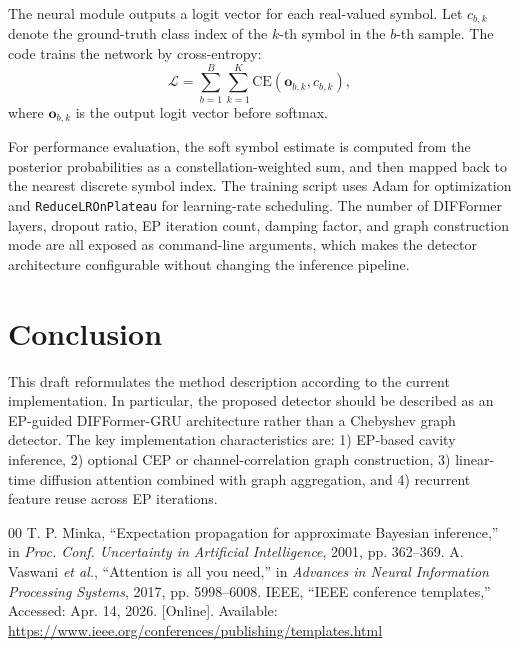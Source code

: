\documentclass[conference]{IEEEtran}
\begin{document}
The neural module outputs a logit vector for each real-valued symbol. Let $c_{b,k}$ denote the ground-truth class index of the $k$-th symbol in the $b$-th sample. The code trains the network by cross-entropy:
\begin{equation}
\mathcal{L}
=
\sum_{b=1}^{B}\sum_{k=1}^{K}
\mathrm{CE}\!\left(
\mathbf{o}_{b,k}, c_{b,k}
\right),
\label{eq:loss}
\end{equation}
where $\mathbf{o}_{b,k}$ is the output logit vector before softmax.

For performance evaluation, the soft symbol estimate is computed from the posterior probabilities as a constellation-weighted sum, and then mapped back to the nearest discrete symbol index. The training script uses Adam for optimization and \texttt{ReduceLROnPlateau} for learning-rate scheduling. The number of DIFFormer layers, dropout ratio, EP iteration count, damping factor, and graph construction mode are all exposed as command-line arguments, which makes the detector architecture configurable without changing the inference pipeline.

\section{Conclusion}

This draft reformulates the method description according to the current implementation. In particular, the proposed detector should be described as an EP-guided DIFFormer-GRU architecture rather than a Chebyshev graph detector. The key implementation characteristics are: 1) EP-based cavity inference, 2) optional CEP or channel-correlation graph construction, 3) linear-time diffusion attention combined with graph aggregation, and 4) recurrent feature reuse across EP iterations.

\begin{thebibliography}{00}
 T. P. Minka, ``Expectation propagation for approximate Bayesian inference,'' in \emph{Proc. Conf. Uncertainty in Artificial Intelligence}, 2001, pp. 362--369.
 A. Vaswani \emph{et al.}, ``Attention is all you need,'' in \emph{Advances in Neural Information Processing Systems}, 2017, pp. 5998--6008.
 IEEE, ``IEEE conference templates,'' Accessed: Apr. 14, 2026. [Online]. Available: \url{https://www.ieee.org/conferences/publishing/templates.html}
\end{thebibliography}
\end{document}
